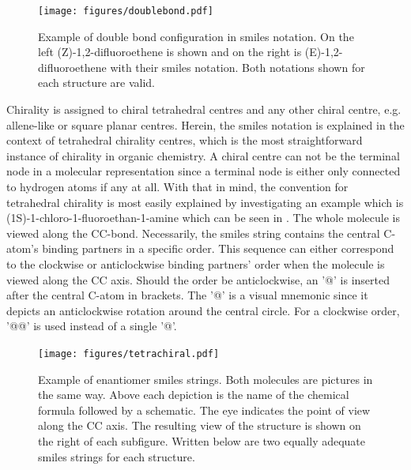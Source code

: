 \begin{figure}[H]
	\centering
	\texttt{[image: figures/doublebond.pdf]}
	\caption[Example of Double Bond Configuration in \ac{smiles} Notation]{Example of double bond configuration in \ac{smiles} notation. On the left (Z)-1,2-difluoroethene is shown and on the right is (E)-1,2-difluoroethene with their \ac{smiles} notation. Both notations shown for each structure are valid.\cite{smilesmanual}}
	\label{fig:doublebond}
\end{figure}\noindent
Chirality is assigned to chiral tetrahedral centres and any other chiral centre, e.g. allene-like or square planar centres. Herein, the \ac{smiles} notation is explained in the context of tetrahedral chirality centres, which is the most straightforward instance of chirality in organic chemistry. A chiral centre can not be the terminal node in a molecular representation since a terminal node is either only connected to hydrogen atoms if any at all. With that in mind, the convention for tetrahedral chirality is most easily explained by investigating an example which is (1S)-1-chloro-1-fluoroethan-1-amine which can be seen in . The whole molecule is viewed along the CC-bond. Necessarily, the \ac{smiles} string contains the central C-atom's binding partners in a specific order. This sequence can either correspond to the clockwise or anticlockwise binding partners' order when the molecule is viewed along the CC axis. Should the order be anticlockwise, an '@' is inserted after the central C-atom in brackets. The '@' is a visual mnemonic since it depicts an anticlockwise rotation around the central circle. For a clockwise order, '@@' is used instead of a single '@'.
\begin{figure}[H]
	\centering
	\texttt{[image: figures/tetrachiral.pdf]}
	\caption[Example of Enantiomere \ac{smiles} Strings]{Example of enantiomer \ac{smiles} strings.\cite{smilesmanual} Both molecules are pictures in the same way. Above each depiction is the name of the chemical formula followed by a schematic. The eye indicates the point of view along the CC axis. The resulting view of the structure is shown on the right of each subfigure. Written below are two equally adequate \ac{smiles} strings for each structure.}
	\label{fig:enantio}	
\end{figure}\noindent
%
%
